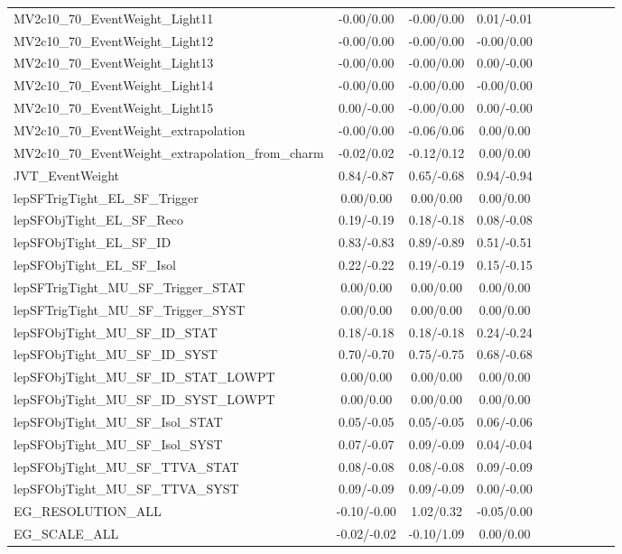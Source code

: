 \begin{table}[h]
\begin{center}
\begin{tabular}{l|ccccccccc}
MV2c10\_70\_EventWeight\_Light11 &-0.00/0.00 &-0.00/0.00 &0.01/-0.01 \\
MV2c10\_70\_EventWeight\_Light12 &-0.00/0.00 &-0.00/0.00 &-0.00/0.00 \\
MV2c10\_70\_EventWeight\_Light13 &-0.00/0.00 &-0.00/0.00 &0.00/-0.00 \\
MV2c10\_70\_EventWeight\_Light14 &-0.00/0.00 &-0.00/0.00 &-0.00/0.00 \\
MV2c10\_70\_EventWeight\_Light15 &0.00/-0.00 &-0.00/0.00 &0.00/-0.00 \\
MV2c10\_70\_EventWeight\_extrapolation &-0.00/0.00 &-0.06/0.06 &0.00/0.00 \\
MV2c10\_70\_EventWeight\_extrapolation\_from\_charm &-0.02/0.02 &-0.12/0.12 &0.00/0.00 \\
JVT\_EventWeight &0.84/-0.87 &0.65/-0.68 &0.94/-0.94 \\
lepSFTrigTight\_EL\_SF\_Trigger &0.00/0.00 &0.00/0.00 &0.00/0.00 \\
lepSFObjTight\_EL\_SF\_Reco &0.19/-0.19 &0.18/-0.18 &0.08/-0.08 \\
lepSFObjTight\_EL\_SF\_ID &0.83/-0.83 &0.89/-0.89 &0.51/-0.51 \\
lepSFObjTight\_EL\_SF\_Isol &0.22/-0.22 &0.19/-0.19 &0.15/-0.15 \\
lepSFTrigTight\_MU\_SF\_Trigger\_STAT &0.00/0.00 &0.00/0.00 &0.00/0.00 \\
lepSFTrigTight\_MU\_SF\_Trigger\_SYST &0.00/0.00 &0.00/0.00 &0.00/0.00 \\
lepSFObjTight\_MU\_SF\_ID\_STAT &0.18/-0.18 &0.18/-0.18 &0.24/-0.24 \\
lepSFObjTight\_MU\_SF\_ID\_SYST &0.70/-0.70 &0.75/-0.75 &0.68/-0.68 \\
lepSFObjTight\_MU\_SF\_ID\_STAT\_LOWPT &0.00/0.00 &0.00/0.00 &0.00/0.00 \\
lepSFObjTight\_MU\_SF\_ID\_SYST\_LOWPT &0.00/0.00 &0.00/0.00 &0.00/0.00 \\
lepSFObjTight\_MU\_SF\_Isol\_STAT &0.05/-0.05 &0.05/-0.05 &0.06/-0.06 \\
lepSFObjTight\_MU\_SF\_Isol\_SYST &0.07/-0.07 &0.09/-0.09 &0.04/-0.04 \\
lepSFObjTight\_MU\_SF\_TTVA\_STAT &0.08/-0.08 &0.08/-0.08 &0.09/-0.09 \\
lepSFObjTight\_MU\_SF\_TTVA\_SYST &0.09/-0.09 &0.09/-0.09 &0.00/-0.00 \\
EG\_RESOLUTION\_ALL &-0.10/-0.00 &1.02/0.32 &-0.05/0.00 \\
EG\_SCALE\_ALL &-0.02/-0.02 &-0.10/1.09 &0.00/0.00 \\

\end{tabular}
\end{center}
\end{table}
